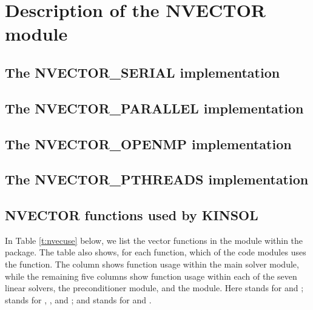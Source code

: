 \chapter{Description of the NVECTOR module}\label{s:nvector}


\section{The NVECTOR\_SERIAL implementation}\label{ss:nvec_ser}


\section{The NVECTOR\_PARALLEL implementation}\label{ss:nvec_par}


\section{The NVECTOR\_OPENMP implementation}\label{ss:nvec_openmp}


\section{The NVECTOR\_PTHREADS implementation}\label{ss:nvec_pthreads}


\section{NVECTOR functions used by KINSOL}

In Table \ref{t:nvecuse} below, we list the vector functions in the 
{\nvector} module within the {\kinsol} package.
The table also shows, for each function, which of the code modules uses
the function. The {\kinsol} column shows function usage within the main
solver module, while the remaining five columns show function
usage within each of the seven {\kinsol} linear solvers, 
the {\kinbbdpre} preconditioner module, and the {\fkinsol} module.
Here {\kindls} stands for {\kindense} and {\kinband}; {\kinspils} stands
for {\kinspgmr}, {\kinspbcg}, and {\kinsptfqmr}; and {\kinsls}
stands for {\kinklu} and {\kinsuperlumt}.

